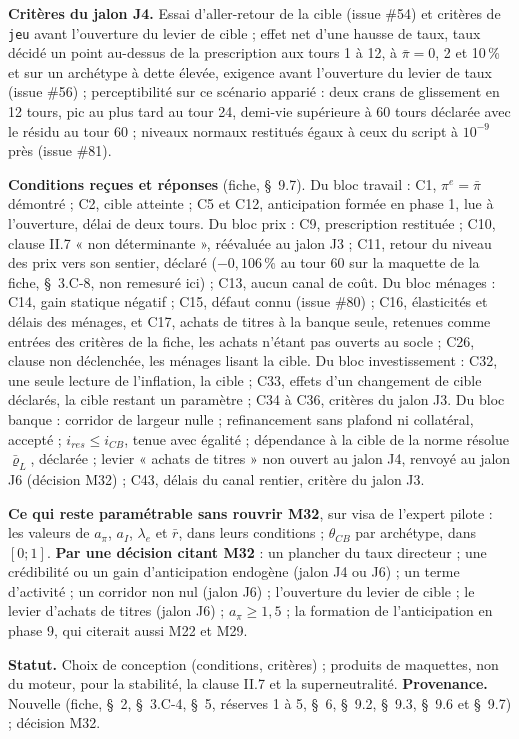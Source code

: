 \documentclass[11pt,a4paper]{article}
\begin{document}
\begin{proposee}
\textbf{Critères du jalon J4.} Essai d'aller-retour de la cible (issue \#54) et critères de \texttt{jeu} avant l'ouverture du levier de cible ; effet net d'une hausse de taux, taux décidé un point au-dessus de la prescription aux tours 1 à 12, à $\bar\pi = 0$, 2 et 10\,\% et sur un archétype à dette élevée, exigence avant l'ouverture du levier de taux (issue \#56) ; perceptibilité sur ce scénario apparié : deux crans de glissement en 12 tours, pic au plus tard au tour 24, demi-vie supérieure à 60 tours déclarée avec le résidu au tour 60 ; niveaux normaux restitués égaux à ceux du script à $10^{-9}$ près (issue \#81).

\textbf{Conditions reçues et réponses} (fiche, \S~9.7). Du bloc travail : C1, $\pi^e = \bar\pi$ démontré ; C2, cible atteinte ; C5 et C12, anticipation formée en phase 1, lue à l'ouverture, délai de deux tours. Du bloc prix : C9, prescription restituée ; C10, clause II.7 « non déterminante », réévaluée au jalon J3 ; C11, retour du niveau des prix vers son sentier, déclaré ($-0{,}106\,\%$ au tour 60 sur la maquette de la fiche, \S~3.C-8, non remesuré ici) ; C13, aucun canal de coût. Du bloc ménages : C14, gain statique négatif ; C15, défaut connu (issue \#80) ; C16, élasticités et délais des ménages, et C17, achats de titres à la banque seule, retenues comme entrées des critères de la fiche, les achats n'étant pas ouverts au socle ; C26, clause non déclenchée, les ménages lisant la cible. Du bloc investissement : C32, une seule lecture de l'inflation, la cible ; C33, effets d'un changement de cible déclarés, la cible restant un paramètre ; C34 à C36, critères du jalon J3. Du bloc banque : corridor de largeur nulle ; refinancement sans plafond ni collatéral, accepté ; $i_{\mathit{res}} \le i_{\mathit{CB}}$, tenue avec égalité ; dépendance à la cible de la norme résolue $\bar\varrho_L$, déclarée ; levier « achats de titres » non ouvert au jalon J4, renvoyé au jalon J6 (décision M32) ; C43, délais du canal rentier, critère du jalon J3.

\textbf{Ce qui reste paramétrable sans rouvrir M32}, sur visa de l'expert pilote : les valeurs de $a_\pi$, $a_I$, $\lambda_e$ et $\bar r$, dans leurs conditions ; $\theta_{\mathit{CB}}$ par archétype, dans $[0 ; 1]$. \textbf{Par une décision citant M32} : un plancher du taux directeur ; une crédibilité ou un gain d'anticipation endogène (jalon J4 ou J6) ; un terme d'activité ; un corridor non nul (jalon J6) ; l'ouverture du levier de cible ; le levier d'achats de titres (jalon J6) ; $a_\pi \ge 1{,}5$ ; la formation de l'anticipation en phase 9, qui citerait aussi M22 et M29.

\textbf{Statut.} Choix de conception (conditions, critères) ; produits de maquettes, non du moteur, pour la stabilité, la clause II.7 et la superneutralité. \textbf{Provenance.} Nouvelle (fiche, \S~2, \S~3.C-4, \S~5, réserves 1 à 5, \S~6, \S~9.2, \S~9.3, \S~9.6 et \S~9.7) ; décision M32.
\end{proposee}
\end{document}
